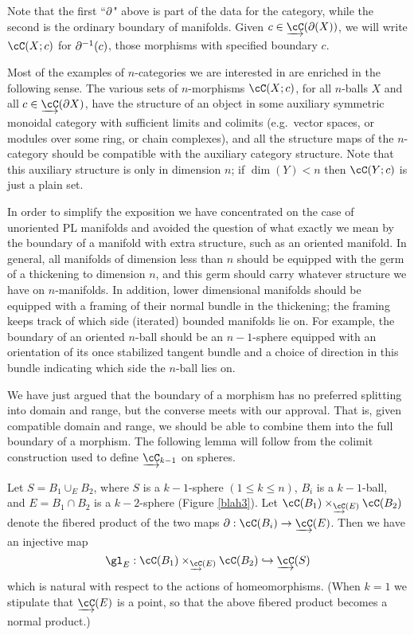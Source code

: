 Note that the first ``$\partial$" above is part of the data for the category, 
while the second is the ordinary boundary of manifolds.
Given $c\in\cl{\cC}(\bd(X))$, we will write $\cC(X; c)$ for $\partial^{-1}(c)$, those morphisms with specified boundary $c$.

Most of the examples of $n$-categories we are interested in are enriched in the following sense.
The various sets of $n$-morphisms $\cC(X; c)$, for all $n$-balls $X$ and
all $c\in \cl{\cC}(\bd X)$, have the structure of an object in some auxiliary symmetric monoidal category
with sufficient limits and colimits
(e.g.\ vector spaces, or modules over some ring, or chain complexes),
and all the structure maps of the $n$-category should be compatible with the auxiliary
category structure.
Note that this auxiliary structure is only in dimension $n$; if $\dim(Y) < n$ then 
$\cC(Y; c)$ is just a plain set.

\medskip

In order to simplify the exposition we have concentrated on the case of 
unoriented PL manifolds and avoided the question of what exactly we mean by 
the boundary of a manifold with extra structure, such as an oriented manifold.
In general, all manifolds of dimension less than $n$ should be equipped with the germ
of a thickening to dimension $n$, and this germ should carry whatever structure we have 
on $n$-manifolds.
In addition, lower dimensional manifolds should be equipped with a framing
of their normal bundle in the thickening; the framing keeps track of which
side (iterated) bounded manifolds lie on.
For example, the boundary of an oriented $n$-ball
should be an $n{-}1$-sphere equipped with an orientation of its once stabilized tangent
bundle and a choice of direction in this bundle indicating
which side the $n$-ball lies on.

\medskip

We have just argued that the boundary of a morphism has no preferred splitting into
domain and range, but the converse meets with our approval.
That is, given compatible domain and range, we should be able to combine them into
the full boundary of a morphism.
The following lemma will follow from the colimit construction used to define $\cl{\cC}_{k-1}$
on spheres.

\begin{lem}
\label{lem:domain-and-range}
Let $S = B_1 \cup_E B_2$, where $S$ is a $k{-}1$-sphere $(1\le k\le n)$,
$B_i$ is a $k{-}1$-ball, and $E = B_1\cap B_2$ is a $k{-}2$-sphere (Figure \ref{blah3}).
Let $\cC(B_1) \times_{\cl{\cC}(E)} \cC(B_2)$ denote the fibered product of the 
two maps $\bd: \cC(B_i)\to \cl{\cC}(E)$.
Then we have an injective map
\[
	\gl_E : \cC(B_1) \times_{\cl{\cC}(E)} \cC(B_2) \into \cl{\cC}(S)
\]
which is natural with respect to the actions of homeomorphisms.
(When $k=1$ we stipulate that $\cl{\cC}(E)$ is a point, so that the above fibered product
becomes a normal product.)
\end{lem}

